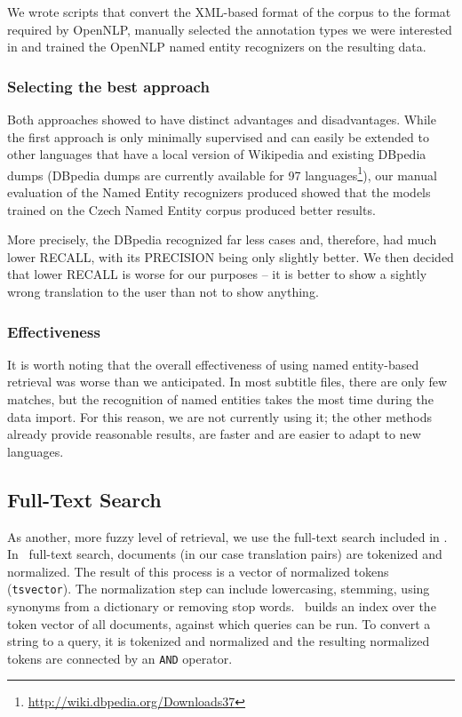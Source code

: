 We wrote scripts that convert the XML-based format of the corpus to the format required by OpenNLP, 
manually selected the annotation types we were interested in and trained the OpenNLP named entity recognizers on the resulting data.


\subsubsection*{Selecting the best approach}

Both approaches showed to have distinct advantages and disadvantages. While the first approach is 
only minimally supervised and can easily be extended to other languages that have a local version of 
Wikipedia and existing DBpedia dumps (DBpedia dumps are currently available for 97 languages\footnote{\url{http://wiki.dbpedia.org/Downloads37}}), 
our manual evaluation of the Named Entity recognizers produced showed that the 
models trained on the Czech Named Entity corpus produced better results.

More precisely,
the DBpedia recognized far less cases and, therefore, had much lower RECALL, with its PRECISION being only slightly better. We then decided that lower RECALL is worse for our purposes -- it is better to show a sightly wrong translation to the user than not to show anything.

\subsubsection*{Effectiveness}
It is worth noting that the overall effectiveness of using named entity-based retrieval was worse than we anticipated. In most subtitle files, there are only few matches, but the recognition of named entities takes the most time during the data import.
For this reason,
we are not currently using it; the other methods already provide reasonable results, are faster and are easier to adapt to new languages.

\subsection{Full-Text Search}

As another, more fuzzy level of retrieval, we use the full-text search included in \postgres. In  \postgres~full-text search, documents (in our case translation pairs) are tokenized and normalized. The result of this process is a vector of normalized tokens ({\tt tsvector}). The normalization step can include lowercasing, stemming, using synonyms from a dictionary or removing stop words.
\postgres~builds an index over the token vector of all documents, against which queries can be run. To convert a string to a query, it is tokenized and normalized and the resulting normalized tokens are connected by an {\tt AND} operator.

